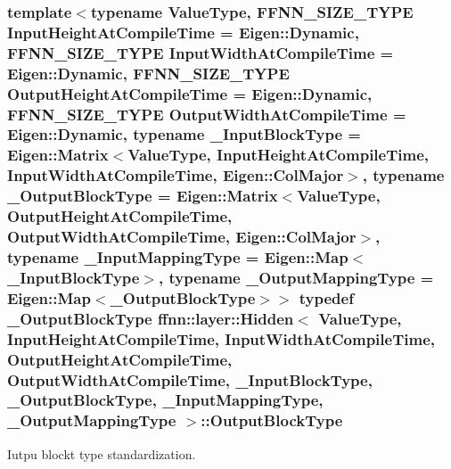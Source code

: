 \hypertarget{classffnn_1_1layer_1_1_hidden_abb03ddc71360cc7ebdab03cd4d1553ee}{
\subsubsection[{Output\-Block\-Type}]{\setlength{\rightskip}{0pt plus 5cm}template$<$typename Value\-Type, F\-F\-N\-N\-\_\-\-S\-I\-Z\-E\-\_\-\-T\-Y\-P\-E Input\-Height\-At\-Compile\-Time = Eigen\-::\-Dynamic, F\-F\-N\-N\-\_\-\-S\-I\-Z\-E\-\_\-\-T\-Y\-P\-E Input\-Width\-At\-Compile\-Time = Eigen\-::\-Dynamic, F\-F\-N\-N\-\_\-\-S\-I\-Z\-E\-\_\-\-T\-Y\-P\-E Output\-Height\-At\-Compile\-Time = Eigen\-::\-Dynamic, F\-F\-N\-N\-\_\-\-S\-I\-Z\-E\-\_\-\-T\-Y\-P\-E Output\-Width\-At\-Compile\-Time = Eigen\-::\-Dynamic, typename \-\_\-\-Input\-Block\-Type = Eigen\-::\-Matrix$<$\-Value\-Type, Input\-Height\-At\-Compile\-Time, Input\-Width\-At\-Compile\-Time, Eigen\-::\-Col\-Major$>$, typename \-\_\-\-Output\-Block\-Type = Eigen\-::\-Matrix$<$\-Value\-Type, Output\-Height\-At\-Compile\-Time, Output\-Width\-At\-Compile\-Time, Eigen\-::\-Col\-Major$>$, typename \-\_\-\-Input\-Mapping\-Type = Eigen\-::\-Map$<$\-\_\-\-Input\-Block\-Type$>$, typename \-\_\-\-Output\-Mapping\-Type = Eigen\-::\-Map$<$\-\_\-\-Output\-Block\-Type$>$$>$ typedef \-\_\-\-Output\-Block\-Type {\bf ffnn\-::layer\-::\-Hidden}$<$ Value\-Type, Input\-Height\-At\-Compile\-Time, Input\-Width\-At\-Compile\-Time, Output\-Height\-At\-Compile\-Time, Output\-Width\-At\-Compile\-Time, \-\_\-\-Input\-Block\-Type, \-\_\-\-Output\-Block\-Type, \-\_\-\-Input\-Mapping\-Type, \-\_\-\-Output\-Mapping\-Type $>$\-::{\bf Output\-Block\-Type}}}\label{classffnn_1_1layer_1_1_hidden_abb03ddc71360cc7ebdab03cd4d1553ee}


Iutpu blockt type standardization. 


